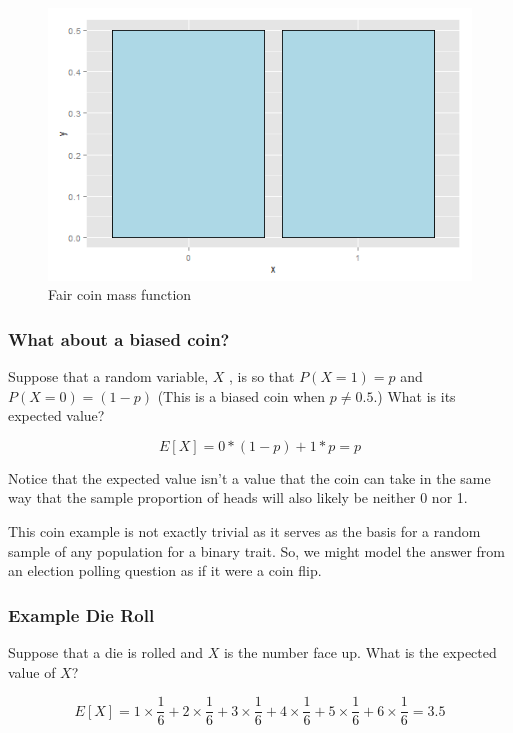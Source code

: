 \documentclass[]{article}
\begin{document}
\begin{figure}[htbp]
\centering
\includegraphics{LeanPub/images/fairCoin-1.png}
\caption{Fair coin mass function}
\end{figure}

\subsubsection{What about a biased
coin?}\label{what-about-a-biased-coin}

Suppose that a random variable, $X$ , is so that $P(X=1) = p$ and
$P(X=0) = (1 - p)$ (This is a biased coin when $p\neq 0.5$.) What is its
expected value?

\[
E[X] = 0 * (1 - p) + 1 * p = p
\]

Notice that the expected value isn't a value that the coin can take in
the same way that the sample proportion of heads will also likely be
neither 0 nor 1.

This coin example is not exactly trivial as it serves as the basis for a
random sample of any population for a binary trait. So, we might model
the answer from an election polling question as if it were a coin flip.

\subsubsection{Example Die Roll}\label{example-die-roll}

Suppose that a die is rolled and $X$ is the number face up. What is the
expected value of $X$?

\[
E[X] = 1 \times \frac{1}{6} + 2 \times \frac{1}{6} +
3 \times \frac{1}{6} + 4 \times \frac{1}{6} +
5 \times \frac{1}{6} + 6 \times \frac{1}{6} = 3.5
\]
\end{document}

